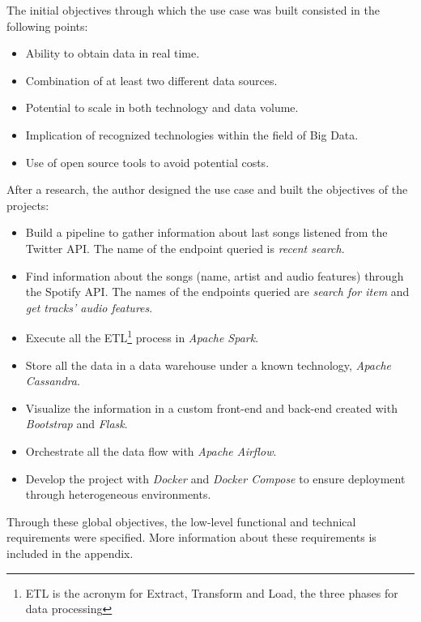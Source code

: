 
\nonzeroparskip The initial objectives through which the use case was built consisted in the following points:
\begin{itemize}
	\item Ability to obtain data in real time.
	\item Combination of at least two different data sources.
	\item Potential to scale in both technology and data volume.
	\item Implication of recognized technologies within the field of Big Data.
	\item Use of open source tools to avoid potential costs.
\end{itemize}

\nonzeroparskip After a research, the author designed the use case and built the objectives of the projects:
\begin{itemize}
	\item Build a pipeline to gather information about last songs listened from the Twitter API. The name of the endpoint queried is \textit{recent search}.
	\item Find information about the songs (name, artist and audio features) through the Spotify API. The names of the endpoints queried are \textit{search for item} and \textit{get tracks' audio features}.
	\item Execute all the ETL\footnote{ETL is the acronym for Extract, Transform and Load, the three phases for data processing} process in \textit{Apache Spark}.
	\item Store all the data in a data warehouse under a known technology, \textit{Apache Cassandra}.
	\item Visualize the information in a custom front-end and back-end created with \textit{Bootstrap} and \textit{Flask}.
	\item Orchestrate all the data flow with \textit{Apache Airflow}.
	\item Develop the project with \textit{Docker} and \textit{Docker Compose} to ensure deployment through heterogeneous environments.
\end{itemize}

\nonzeroparskip Through these global objectives, the low-level functional and technical requirements were specified. More information about these requirements is included in the appendix.